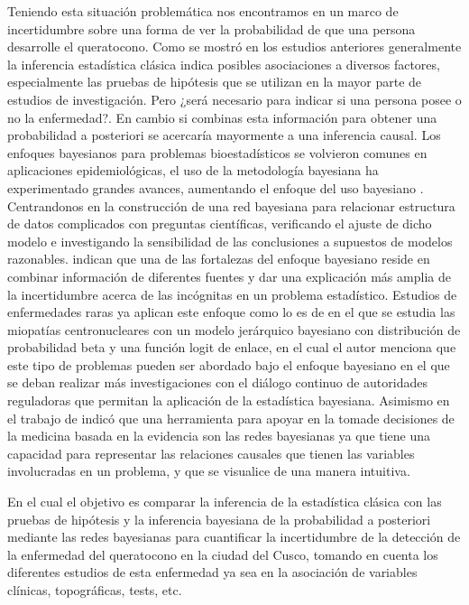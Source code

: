 Teniendo esta situación problemática nos encontramos en un marco de incertidumbre sobre una forma de ver la probabilidad de que una persona desarrolle el queratocono. Como se mostró en los estudios anteriores generalmente la inferencia estadística clásica indica posibles asociaciones a diversos factores, especialmente las pruebas de hipótesis que se utilizan en la mayor parte de estudios de investigación. Pero ¿será necesario para indicar si una persona posee o no la enfermedad?. En cambio si combinas esta información para obtener una probabilidad a posteriori se acercaría mayormente a una inferencia causal. Los enfoques bayesianos para problemas bioestadísticos se volvieron comunes en aplicaciones epidemiológicas, el uso de la metodología bayesiana ha experimentado grandes avances, aumentando el enfoque del uso bayesiano \textcite{lawson2018bayesian}. Centrandonos en la construcción de una red bayesiana para relacionar estructura de datos complicados con preguntas científicas, verificando el ajuste de dicho modelo e investigando la sensibilidad de las conclusiones a supuestos de modelos razonables. \textcite{Gelman_2013} indican que una de las fortalezas del enfoque bayesiano reside en combinar información de diferentes fuentes y dar una explicación más amplia de la incertidumbre acerca de las incógnitas en un problema estadístico.
Estudios de enfermedades raras ya aplican este enfoque como lo es de \textcite{fouarge2021hierarchical} en el que se estudia las miopatías centronucleares con un modelo jerárquico bayesiano con distribución de probabilidad beta y una función logit de enlace, en el cual el autor menciona que este tipo de problemas pueden ser abordado bajo el enfoque bayesiano en el que se deban realizar más investigaciones con el diálogo continuo de autoridades reguladoras que permitan la aplicación de la estadística bayesiana. Asimismo en el trabajo de \textcite{ferez2017redes} indicó que una herramienta para apoyar en la tomade decisiones de la medicina basada en la evidencia son las redes bayesianas ya que tiene una capacidad para representar las relaciones causales que tienen las variables involucradas en un problema, y que se visualice de una manera intuitiva.

En el cual el objetivo es comparar la inferencia de la estadística clásica con las pruebas de hipótesis y la inferencia bayesiana de la probabilidad a posteriori mediante las redes bayesianas para cuantificar la incertidumbre de la detección de la enfermedad del queratocono en la ciudad del Cusco, tomando en cuenta los diferentes estudios de esta enfermedad ya sea en la asociación de variables clínicas, topográficas, tests, etc.

